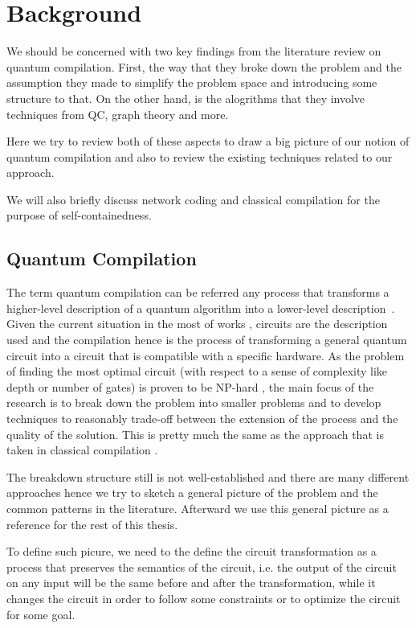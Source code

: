 \documentclass{report}
\begin{document}
\chapter{Background}\label{chap:background}

We should be concerned with two key findings from the literature review on quantum compilation. First, the way that they broke down the problem and the assumption they made to simplify the problem space and introducing some structure to that. On the other hand, is the alogrithms that they involve techniques from QC, graph theory and more.

Here we try to review both of these aspects to draw a big picture of our notion of quantum compilation and also to review the existing techniques related to our approach.

We will also briefly discuss network coding and classical compilation for the purpose of self-containedness.

\section{Quantum Compilation}


The term quantum compilation can be referred any process that transforms a higher-level description of a quantum algorithm into a lower-level description~\cite{hundt2022}. Given the current situation in the most of works \cite{TODO}, circuits are the description used and the compilation hence is the process of transforming a general quantum circuit into a circuit that is compatible with a specific hardware. As the problem of finding the most optimal circuit (with respect to a sense of complexity like depth or number of gates) is proven to be NP-hard \cite{TODO}, the main focus of the research is to break down the problem into smaller problems and to develop techniques to reasonably trade-off between the extension of the process and the quality of the solution. This is pretty much the same as the approach that is taken in classical compilation \cite{TODO}.

The breakdown structure still is not well-established and there are many different approaches \cite{} hence we try to sketch a general picture of the problem and the common patterns in the literature. Afterward we use this general picture as a reference for the rest of this thesis. 

To define such picure, we need to the define the circuit transformation as a process that preserves the semantics of the circuit, i.e. the output of the circuit on any input will be the same before and after the transformation, while it changes the circuit in order to follow some constraints or to optimize the circuit for some goal.
\end{document}
